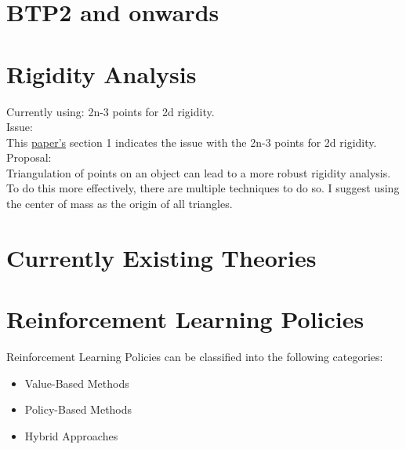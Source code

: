 \documentclass[12pt,english]{report}
\begin{document}
\chapter{BTP2 and onwards}
\chapter{Rigidity Analysis}
Currently using: 2n-3 points for 2d rigidity.\\
Issue:\\
This \href{https://arxiv.org/pdf/1707.03633}{paper's} section 1 indicates the issue with the 2n-3 points for 2d rigidity. \\
Proposal:\\
Triangulation of points on an object can lead to a more robust rigidity analysis. To do this more effectively, there are multiple techniques to do so. I suggest using the center of mass as the origin of all triangles.
\chapter{Currently Existing Theories}
\chapter{Reinforcement Learning Policies}
Reinforcement Learning Policies can be classified into the following categories:
\begin{itemize}
    \item Value-Based Methods
    \item Policy-Based Methods
    \item Hybrid Approaches
\end{itemize}
\end{document}
